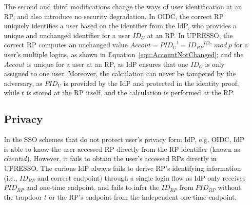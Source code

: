 The second and third modifications change the ways of user identification at an RP, and also introduce no security degradation.
In OIDC, the correct RP uniquely identifies a user based on the identifier from the IdP, who provides a unique and unchanged identifier for a user $ID_U$ at an RP.
In UPRESSO,  the correct RP  computes an unchanged value $Accout = {PID_U}^t = {ID_{RP}}^{ID_U}\ mod\ p$  for a user's multiple logins, as shown in Equation~\ref{equ:AccountNotChanged};
 and the $Accout$ is unique for a user at an RP,  as IdP ensures that one $ID_U$ is only assigned to one user.
Moreover, the calculation can never be tampered by the adversary,  as  $PID_U$ is provided by the IdP and protected in the identity proof, while $t$ is stored at the RP itself, and the calculation is performed at the RP.


\subsection{Privacy}
\label{subsec:privacy}
In the SSO schemes that do not protect user's privacy form IdP, e.g. OIDC, IdP is able to know the user accessed RP directly from the RP identifier (known as $client id$). However, it fails to obtain the user's accessed RPs directly in UPRESSO. The curious IdP always fails to derive RP's identifying information (i.e., $ID_{RP}$ and correct endpoint) through a single login flow as IdP only receives $PID_{RP}$ and one-time endpoint, and fails to infer the $ID_{RP}$ from $PID_{RP}$ without the  trapdoor $t$
or the RP's endpoint from the independent one-time endpoint.

